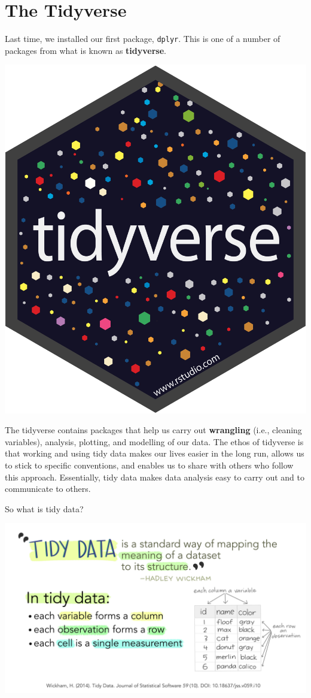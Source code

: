 \documentclass[
]{book}
\begin{document}
\hypertarget{the-tidyverse}{%
\section{The Tidyverse}\label{the-tidyverse}}

Last time, we installed our first package, \texttt{dplyr}. This is one of a number of packages from what is known as \textbf{tidyverse}.

\includegraphics[width=30.76in]{Images/tidyverse-logo}

The tidyverse contains packages that help us carry out \textbf{wrangling} (i.e., cleaning variables), analysis, plotting, and modelling of our data. The ethos of tidyverse is that working and using tidy data makes our lives easier in the long run, allows us to stick to specific conventions, and enables us to share with others who follow this approach. Essentially, tidy data makes data analysis easy to carry out and to communicate to others.

So what is tidy data?

\includegraphics[width=66.67in]{Images/tidydata_1}
\end{document}
